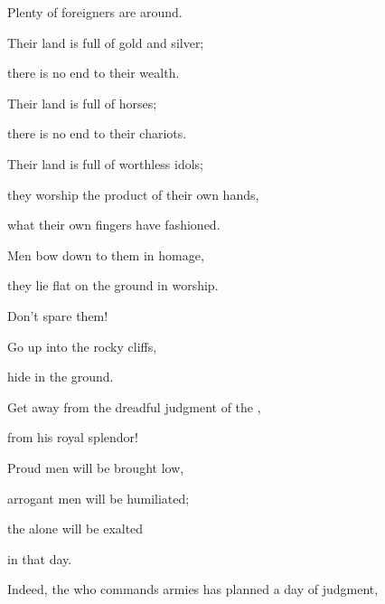 {\par }{\Q Plenty
of foreigners
are around.
\par }{\Q {}Their land
is full
of gold
and silver;
\par }{\Q there is no
end
to their wealth.
\par }{\Q Their land
is full
of horses;
\par }{\Q there is no
end
to their chariots.
\par }{\Q {}Their land
is full
of worthless idols;
\par }{\Q they worship
the product
of their own hands,
\par }{\Q what their own fingers
have
fashioned.
\par }{\Q {}Men
bow down
to them in homage,
\par }{\Q they lie flat on the ground in worship.
\par }{\Q Don’t
spare them!
\par }{\Q {}Go
up into the rocky
cliffs,
\par }{\Q hide
in the ground.
\par }{\Q Get away
from the dreadful
judgment of the
{},

\par }{\Q from his royal
splendor!
\par }{\Q {}Proud
men
will be brought low,
\par }{\Q arrogant
men
will be humiliated;
\par }{\Q the {}
alone
will be exalted
\par }{\Q in that day.
\par }{\Q {}Indeed,
the {}
who commands armies
has planned a day
of judgment,

}
